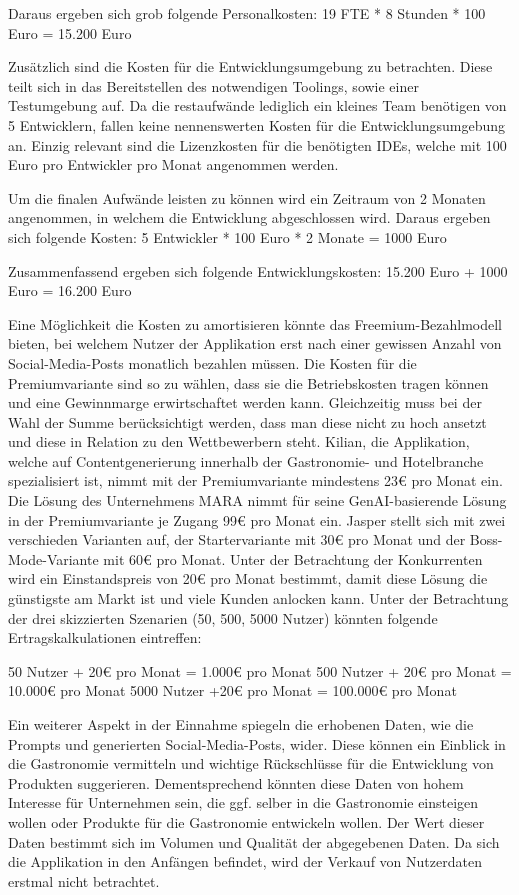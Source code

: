 Daraus ergeben sich grob folgende Personalkosten:
19 FTE * 8 Stunden * 100 Euro = 15.200 Euro

Zusätzlich sind die Kosten für die Entwicklungsumgebung zu betrachten.
Diese teilt sich in das Bereitstellen des notwendigen Toolings, sowie einer Testumgebung auf.
Da die restaufwände lediglich ein kleines Team benötigen von 5 Entwicklern, fallen keine nennenswerten Kosten für die Entwicklungsumgebung an.
Einzig relevant sind die Lizenzkosten für die benötigten IDEs, welche mit 100 Euro pro Entwickler pro Monat angenommen werden.

Um die finalen Aufwände leisten zu können wird ein Zeitraum von 2 Monaten angenommen, in welchem die Entwicklung abgeschlossen wird.
Daraus ergeben sich folgende Kosten:
5 Entwickler * 100 Euro * 2 Monate = 1000 Euro

Zusammenfassend ergeben sich folgende Entwicklungskosten:
15.200 Euro + 1000 Euro = 16.200 Euro


Eine Möglichkeit die Kosten zu amortisieren könnte das Freemium-Bezahlmodell bieten, bei welchem Nutzer der Applikation erst nach einer gewissen Anzahl von Social-Media-Posts monatlich bezahlen müssen.
Die Kosten für die Premiumvariante sind so zu wählen, dass sie die Betriebskosten tragen können und eine Gewinnmarge erwirtschaftet werden kann.
Gleichzeitig muss bei der Wahl der Summe berücksichtigt werden, dass man diese nicht zu hoch ansetzt und diese in Relation zu den Wettbewerbern steht.
Kilian, die Applikation, welche auf Contentgenerierung innerhalb der Gastronomie- und Hotelbranche spezialisiert ist, nimmt mit der Premiumvariante mindestens 23€ pro Monat ein.
Die Lösung des Unternehmens MARA nimmt für seine GenAI-basierende Lösung in der Premiumvariante je Zugang 99€ pro Monat ein.
Jasper stellt sich mit zwei verschieden Varianten auf, der Startervariante mit 30€ pro Monat und der Boss-Mode-Variante mit 60€ pro Monat.
Unter der Betrachtung der Konkurrenten wird ein Einstandspreis von 20€ pro Monat bestimmt, damit diese Lösung die günstigste am Markt ist und viele Kunden anlocken kann.
Unter der Betrachtung der drei skizzierten Szenarien (50, 500, 5000 Nutzer) könnten folgende Ertragskalkulationen eintreffen:

50 Nutzer + 20€ pro Monat = 1.000€ pro Monat
500 Nutzer + 20€ pro Monat = 10.000€ pro Monat
5000 Nutzer +20€ pro Monat = 100.000€ pro Monat


Ein weiterer Aspekt in der Einnahme spiegeln die erhobenen Daten, wie die Prompts und generierten Social-Media-Posts, wider.
Diese können ein Einblick in die Gastronomie vermitteln und wichtige Rückschlüsse für die Entwicklung von Produkten suggerieren.
Dementsprechend könnten diese Daten von hohem Interesse für Unternehmen sein, die ggf. selber in die Gastronomie einsteigen wollen oder Produkte für die Gastronomie entwickeln wollen.
Der Wert dieser Daten bestimmt sich im Volumen und Qualität der abgegebenen Daten.
Da sich die Applikation in den Anfängen befindet, wird der Verkauf von Nutzerdaten erstmal nicht betrachtet.

